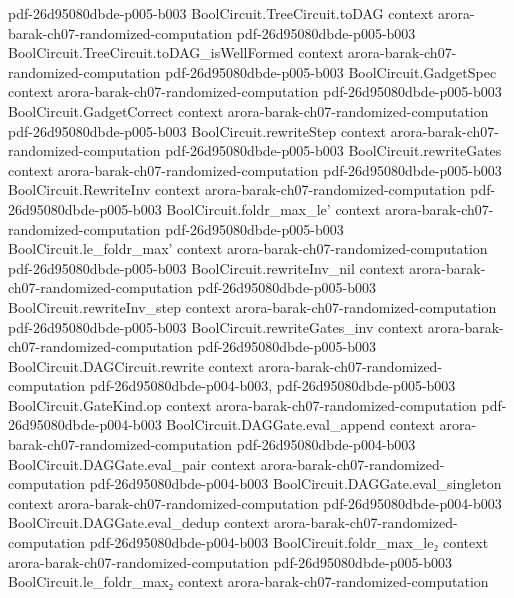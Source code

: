 \begin{theorem}
  {pdf-26d95080dbde-p005-b003}
\proofstep
  {BoolCircuit.TreeCircuit.toDAG}
  {context}
  {arora-barak-ch07-randomized-computation}
  {pdf-26d95080dbde-p005-b003}
\proofstep
  {BoolCircuit.TreeCircuit.toDAG_isWellFormed}
  {context}
  {arora-barak-ch07-randomized-computation}
  {pdf-26d95080dbde-p005-b003}
\proofstep
  {BoolCircuit.GadgetSpec}
  {context}
  {arora-barak-ch07-randomized-computation}
  {pdf-26d95080dbde-p005-b003}
\proofstep
  {BoolCircuit.GadgetCorrect}
  {context}
  {arora-barak-ch07-randomized-computation}
  {pdf-26d95080dbde-p005-b003}
\proofstep
  {BoolCircuit.rewriteStep}
  {context}
  {arora-barak-ch07-randomized-computation}
  {pdf-26d95080dbde-p005-b003}
\proofstep
  {BoolCircuit.rewriteGates}
  {context}
  {arora-barak-ch07-randomized-computation}
  {pdf-26d95080dbde-p005-b003}
\proofstep
  {BoolCircuit.RewriteInv}
  {context}
  {arora-barak-ch07-randomized-computation}
  {pdf-26d95080dbde-p005-b003}
\proofstep
  {BoolCircuit.foldr_max_le'}
  {context}
  {arora-barak-ch07-randomized-computation}
  {pdf-26d95080dbde-p005-b003}
\proofstep
  {BoolCircuit.le_foldr_max'}
  {context}
  {arora-barak-ch07-randomized-computation}
  {pdf-26d95080dbde-p005-b003}
\proofstep
  {BoolCircuit.rewriteInv_nil}
  {context}
  {arora-barak-ch07-randomized-computation}
  {pdf-26d95080dbde-p005-b003}
\proofstep
  {BoolCircuit.rewriteInv_step}
  {context}
  {arora-barak-ch07-randomized-computation}
  {pdf-26d95080dbde-p005-b003}
\proofstep
  {BoolCircuit.rewriteGates_inv}
  {context}
  {arora-barak-ch07-randomized-computation}
  {pdf-26d95080dbde-p005-b003}
\proofstep
  {BoolCircuit.DAGCircuit.rewrite}
  {context}
  {arora-barak-ch07-randomized-computation}
  {pdf-26d95080dbde-p004-b003,
    pdf-26d95080dbde-p005-b003}
\proofstep
  {BoolCircuit.GateKind.op}
  {context}
  {arora-barak-ch07-randomized-computation}
  {pdf-26d95080dbde-p004-b003}
\proofstep
  {BoolCircuit.DAGGate.eval_append}
  {context}
  {arora-barak-ch07-randomized-computation}
  {pdf-26d95080dbde-p004-b003}
\proofstep
  {BoolCircuit.DAGGate.eval_pair}
  {context}
  {arora-barak-ch07-randomized-computation}
  {pdf-26d95080dbde-p004-b003}
\proofstep
  {BoolCircuit.DAGGate.eval_singleton}
  {context}
  {arora-barak-ch07-randomized-computation}
  {pdf-26d95080dbde-p004-b003}
\proofstep
  {BoolCircuit.DAGGate.eval_dedup}
  {context}
  {arora-barak-ch07-randomized-computation}
  {pdf-26d95080dbde-p004-b003}
\proofstep
  {BoolCircuit.foldr_max_le₂}
  {context}
  {arora-barak-ch07-randomized-computation}
  {pdf-26d95080dbde-p005-b003}
\proofstep
  {BoolCircuit.le_foldr_max₂}
  {context}
  {arora-barak-ch07-randomized-computation}

\end{theorem}
